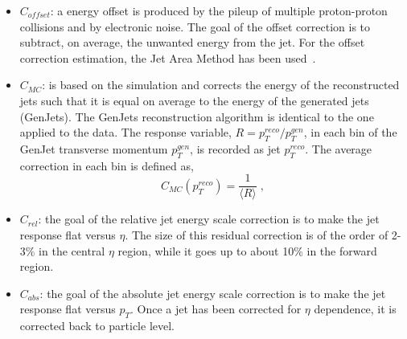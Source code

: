 \begin{itemize}
\item $C_{offset}$: a energy offset is produced by the pileup of multiple proton-proton collisions and by electronic noise.
The goal of the offset correction is to subtract, on average, the unwanted
energy from the jet. For the offset correction estimation, the Jet Area Method has been used~\cite{Cacciari:2007fd}. 
\item $C_{MC}$: is based on the simulation and corrects the energy of the reconstructed
jets such that it is equal on average to the energy of the generated jets (GenJets). The
GenJets reconstruction algorithm is identical to the one applied to the data.
The response variable, $R=p_T^{reco}/p_T^{gen}$, in each bin of the GenJet transverse momentum $p_T^{gen}$, is recorded as jet $p_T^{reco}$.
The average correction in each bin is defined as,
\begin{equation}
  C_{MC}(p_T^{reco})= \frac{1}{\langle R \rangle } \; ,
\end{equation}
\item $C_{rel}$: the goal of the relative jet energy scale correction is to make the jet response flat versus $\eta$. 
The size of this residual correction is of the order of 2-3\% in the
central $\eta$ region, while it goes up to about 10\% in the forward region.
\item $C_{abs}$: the goal of the absolute jet energy scale correction is to make the jet response flat versus $p_T$.
Once a jet has been corrected for $\eta$ dependence, it is corrected back to particle
level.
\end{itemize}
